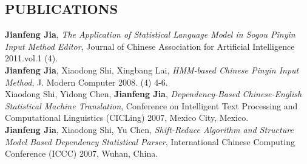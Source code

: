\documentclass{res}
\begin{document}
\begin{resume}
\section{PUBLICATIONS}
     \textbf{Jianfeng Jia}, \emph{The Application of Statistical Language Model in Sogou Pinyin Input Method Editor}, Journal of Chinese Association for Artificial Intelligence 2011.vol.1 (4).\\
     \textbf{Jianfeng Jia}, Xiaodong Shi, Xingbang Lai, \emph{HMM-based Chinese Pinyin Input Method}, J. Modern Computer 2008. (4) 4-6.\\
     Xiaodong Shi, Yidong Chen, \textbf{Jianfeng Jia}, \emph{Dependency-Based Chinese-English Statistical Machine Translation}, Conference on Intelligent Text Processing and Computational Linguistics (CICLing) 2007, Mexico City, Mexico.\\
     \textbf{Jianfeng Jia}, Xiaodong Shi, Yu Chen, \emph{Shift-Reduce Algorithm and Structure Model Based Dependency Statistical Parser}, International Chinese Computing Conference (ICCC) 2007, Wuhan, China.

\end{resume}
\end{document}
